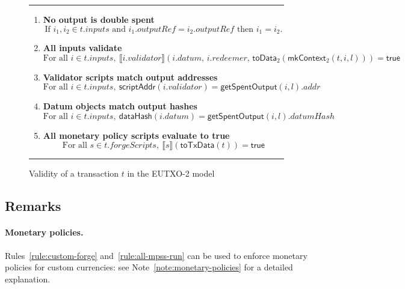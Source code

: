 \documentclass[a4paper]{article}
\newcounter{note}
\newcommand{\s}{\textsf}  %
\newcommand{\msf}[1]{\ensuremath{\mathsf{#1}}}
\newcommand{\mi}[1]{\ensuremath{\mathit{#1}}}
\newcommand\rfskip{7pt}
\newenvironment{ruledfigure}[1]{\begin{figure}[#1]\hrule\vspace{\rfskip}}{\vspace{\rfskip}\hrule\end{figure}}
\newcommand{\true}{\textsf{true}}
\newcommand{\scriptAddr}{\msf{scriptAddr}}
\newcommand{\toData}{\ensuremath{\s{toData}}}
\newcommand{\toTxData}{\ensuremath{\s{toTxData}}}
\newcommand{\mkContext}{\ensuremath{\s{mkContext}}}
\newcommand{\hashData}{\msf{dataHash}}
\newcommand{\inputs}{\mi{inputs}}
\newcommand{\forgeScripts}{\mi{forgeScripts}}
\newcommand{\addr}{\mi{addr}}
\newcommand{\validator}{\mi{validator}}
\newcommand{\redeemer}{\mi{redeemer}}
\newcommand{\datum}{\mi{datum}}
\newcommand{\datumHash}{\mi{datumHash}}
\newcommand{\outputref}{\mi{outputRef}}
\newcommand{\getSpent}{\msf{getSpentOutput}}
\newcommand{\applyScript}[1]{\ensuremath{\llbracket#1\rrbracket}}
\newcommand{\applyMPScript}[1]{\ensuremath{\llbracket#1\rrbracket}}
\begin{document}
\begin{ruledfigure}{H}
\begin{enumerate}
\item
  \label{rule:no-double-spending-2}
  \textbf{No output is double spent}
  \begin{displaymath}
    \textrm{If } i_1, i_2 \in t.\inputs \textrm{ and }  i_1.\outputref = i_2.\outputref
    \textrm{ then } i_1 = i_2.
  \end{displaymath}

\item
  \label{rule:all-inputs-validate-2}
  \textbf{All inputs validate}
  \begin{displaymath}
    \textrm{For all } i \in t.\inputs,\ \applyScript{i.\validator}(i.\datum,\, i.\redeemer,
    \, \toData_2(\mkContext_2(t, i, l))) = \true
  \end{displaymath}

\item
  \label{rule:validator-scripts-hash-2}
  \textbf{Validator scripts match output addresses}
  \begin{displaymath}
    \textrm{For all } i \in t.\inputs,\ \scriptAddr(i.\validator) = \getSpent(i, l).\addr
  \end{displaymath}

\item
  \label{rule:datum-objects-hash-2}
  \textbf{Datum objects match output hashes}
  \begin{displaymath}
    \textrm{For all } i \in t.\inputs,\ \hashData(i.\datum) = \getSpent(i, l).\datumHash
  \end{displaymath}

\item
  \label{rule:all-mpss-run}
  \textbf{All monetary policy scripts evaluate to true}
  \begin{displaymath}
    \textrm{For all } s \in t.\forgeScripts,\ \applyMPScript{s}(\toTxData(t)) = \true
  \end{displaymath}
  
\end{enumerate}
\caption{Validity of a transaction $t$ in the EUTXO-2 model}
\label{fig:eutxo-2-validity}
\end{ruledfigure}

\subsection{Remarks}
\paragraph{Monetary policies.} 
Rules~\ref{rule:custom-forge} and~\ref{rule:all-mpss-run} can be used
to enforce monetary policies for custom currencies: see
Note~\ref{note:monetary-policies} for a detailed explanation.
\end{document}

